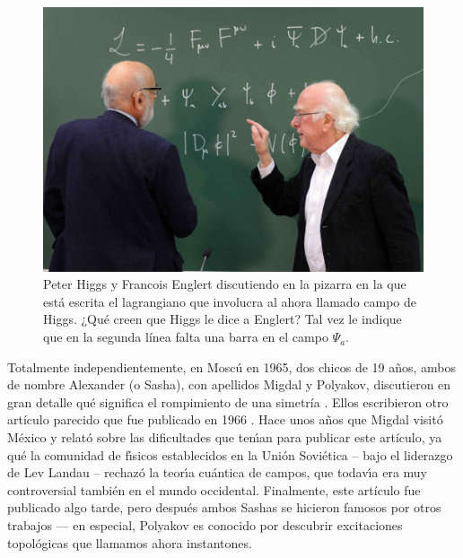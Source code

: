 \begin{figure}
\centering
\includegraphics[scale=0.3]{images/higgs_englert_pizarra.jpeg}
\caption{Peter Higgs y Francois Englert discutiendo en la pizarra en la que est\'a escrita el lagrangiano que involucra al ahora llamado campo de Higgs. ¿Qu\'e creen que Higgs le dice a Englert? Tal vez le indique que en la segunda l\'inea falta una barra en el campo $\Psi_a$.}
\end{figure}




Totalmente independientemente, en Mosc\'{u} en 1965, dos chicos de 19
a\~nos, ambos de nombre Alexander (o Sasha), con apellidos Migdal y
Polyakov, discutieron en gran detalle qu\'e significa el rompimiento
de una simetr\'ia \cite{Nobel13}. Ellos escribieron otro art\'iculo
parecido que fue publicado en 1966 \cite{MigPol}. Hace unos
a\~{n}os que Migdal visit\'o M\'exico y
relat\'o sobre las dificultades que ten\'{\i}an para publicar
este art\'iculo, ya qu\'e la comunidad de f\'{\i}sicos establecidos
en la Uni\'on Sovi\'etica -- bajo el liderazgo de Lev Landau -- rechaz\'o
la teor\'{\i}a cu\'antica de campos, que todav\'{\i}a era muy
controversial tambi\'en en el mundo occidental. Finalmente, este art\'iculo
fue publicado algo tarde, pero despu\'es ambos Sashas se hicieron
famosos por otros trabajos --- en especial, Polyakov es conocido por
descubrir excitaciones topol\'ogicas que llamamos ahora instantones.

